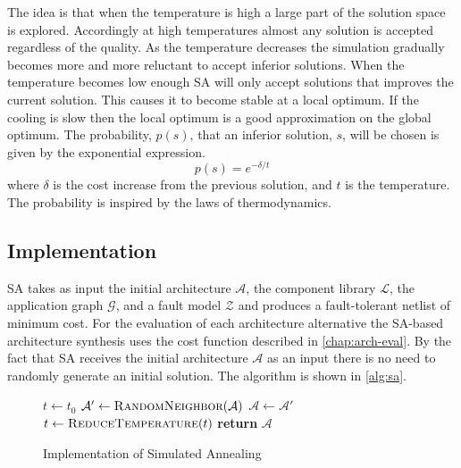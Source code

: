 The idea is that when the temperature is high a large part of the solution space is explored. Accordingly at high temperatures almost any solution is accepted regardless of the quality. As the temperature decreases the simulation gradually becomes more and more reluctant to accept inferior solutions. When the temperature becomes low enough SA will only accept solutions that improves the current solution. This causes it to become stable at a local optimum. If the cooling is slow then the local optimum is a good approximation on the global optimum. The probability, $p(s)$, that an inferior solution, $s$, will be chosen is given by the exponential expression.
$$p(s) = e^{-\delta / t}$$
where $\delta$ is the cost increase from the previous solution, and $t$ is the temperature. The probability is inspired by the laws of thermodynamics.

\subsection{Implementation}
SA takes as input the initial architecture $\mathcal{A}$, the component library $\mathcal{L}$, the application graph $\mathcal{G}$, and a fault model $\mathcal{Z}$ and produces a fault-tolerant netlist of minimum cost. For the evaluation of each architecture alternative the SA-based architecture synthesis uses the cost function described in \autoref{chap:arch-eval}. By the fact that SA receives the initial architecture $\mathcal{A}$ as an input there is no need to randomly generate an initial solution. The algorithm is shown in \autoref{alg:sa}.

\begin{figure}[H]
\centering
\begin{algorithmic}[1]
	\State $t \gets t_0$
		\State $\mathcal{A}' \gets \Call{RandomNeighbor}{\mathcal{A}}$
		\State $\mathcal{A} \gets \mathcal{A}'$ 
		\EndIf
	\EndFor
	\State $t \gets \Call{ReduceTemperature}{t}$
      \EndWhile
	\State \textbf{return} $\mathcal{A}$
    \EndFunction
\end{algorithmic}
\caption[Implementation of Simulated Annealing]{Implementation of Simulated Annealing}
\label{alg:sa}
\end{figure}

